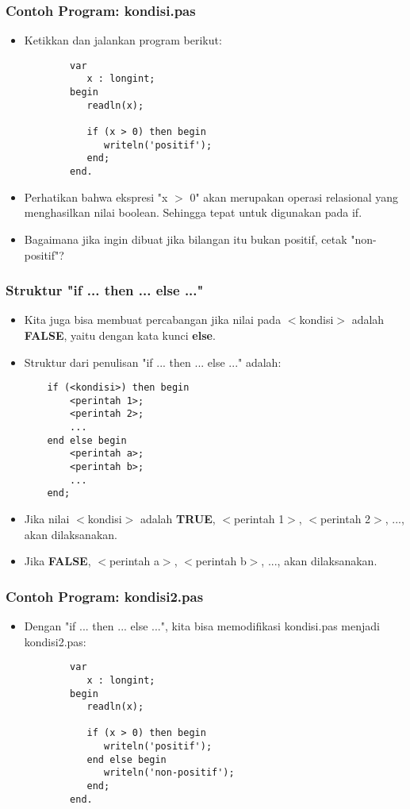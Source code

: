 \documentclass{beamer}
\begin{document}
\begin{frame}[fragile]
\frametitle{Contoh Program: kondisi.pas}
\begin{itemize}
	\item Ketikkan dan jalankan program berikut:
	\begin{lstlisting}
		var
		   x : longint;
		begin
		   readln(x);
		
		   if (x > 0) then begin
		      writeln('positif');
		   end;
		end.
	\end{lstlisting}
	\item Perhatikan bahwa ekspresi "x $>$ 0" akan merupakan operasi relasional yang menghasilkan nilai boolean. Sehingga tepat untuk digunakan pada if.
	\item Bagaimana jika ingin dibuat jika bilangan itu bukan positif, cetak "non-positif"?
\end{itemize}
\end{frame}

\begin{frame}[fragile]
\frametitle{Struktur "if ... then ... else ..."}
\begin{itemize}
	\item Kita juga bisa membuat percabangan jika nilai pada $<$kondisi$>$ adalah \textbf{FALSE}, yaitu dengan kata kunci \textbf{else}.
	\item Struktur dari penulisan "if ... then ... else ..." adalah:
	\begin{lstlisting}
	if (<kondisi>) then begin
	    <perintah 1>;
	    <perintah 2>;
	    ...
	end else begin
	    <perintah a>;
	    <perintah b>;
	    ...	
	end;
	\end{lstlisting}
	
	\item Jika nilai $<$kondisi$>$ adalah \textbf{TRUE}, $<$perintah 1$>$, $<$perintah 2$>$, ..., akan dilaksanakan.
	\item Jika \textbf{FALSE}, $<$perintah a$>$, $<$perintah b$>$, ..., akan dilaksanakan.
\end{itemize}
\end{frame}

\begin{frame}[fragile]
\frametitle{Contoh Program: kondisi2.pas}
\begin{itemize}
	\item Dengan "if ... then ... else ...", kita bisa memodifikasi kondisi.pas menjadi kondisi2.pas:
	\begin{lstlisting}
		var
		   x : longint;
		begin
		   readln(x);
		
		   if (x > 0) then begin
		      writeln('positif');
		   end else begin
		      writeln('non-positif');
		   end;
		end.
	\end{lstlisting}
\end{itemize}
\end{frame}
\end{document}
